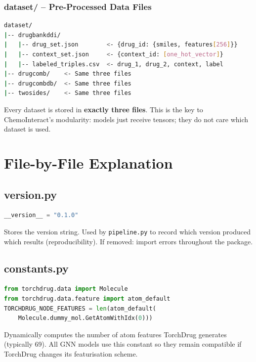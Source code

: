 \documentclass[12pt,a4paper,oneside]{book}
\begin{document}
\subsection{dataset/ -- Pre-Processed Data Files}

\begin{lstlisting}[language=bash]
dataset/
|-- drugbankddi/
|   |-- drug_set.json        <- {drug_id: {smiles, features[256]}}
|   |-- context_set.json     <- {context_id: [one_hot_vector]}
|   |-- labeled_triples.csv  <- drug_1, drug_2, context, label
|-- drugcomb/    <- Same three files
|-- drugcombdb/  <- Same three files
|-- twosides/    <- Same three files
\end{lstlisting}

\begin{tcolorbox}[tipbox]
Every dataset is stored in \textbf{exactly three files}. This is the key to ChemoInteract's modularity: models just receive tensors; they do not care which dataset is used.
\end{tcolorbox}
\chapter{File-by-File Explanation}\label{chap:files}

\section{version.py}
\begin{lstlisting}[language=Python]
__version__ = "0.1.0"
\end{lstlisting}
Stores the version string. Used by \texttt{pipeline.py} to record which version produced which results (reproducibility). If removed: import errors throughout the package.

\section{constants.py}
\begin{lstlisting}[language=Python]
from torchdrug.data import Molecule
from torchdrug.data.feature import atom_default
TORCHDRUG_NODE_FEATURES = len(atom_default(
    Molecule.dummy_mol.GetAtomWithIdx(0)))
\end{lstlisting}
Dynamically computes the number of atom features TorchDrug generates (typically 69). All GNN models use this constant so they remain compatible if TorchDrug changes its featurisation scheme.
\end{document}
